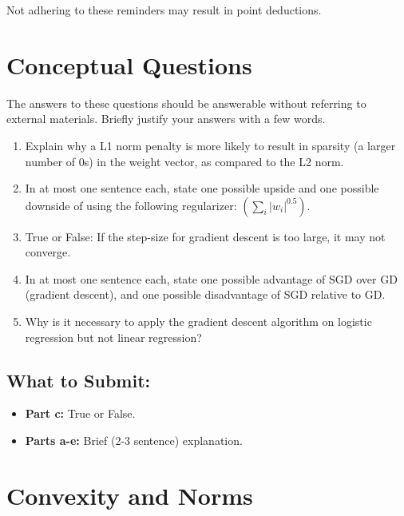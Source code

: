 \documentclass{article}
\begin{document}
Not adhering to these reminders may result in point deductions. \\

\clearpage{}

\section*{Conceptual Questions}

\begin{aprob}
    The answers to these questions should be answerable without referring to external materials.
    Briefly justify your answers with a few words.
    \begin{enumerate}
      \item {} Explain why a L1 norm penalty is more likely to result in sparsity (a larger number of 0s) in the weight vector, as compared to the L2 norm.
      \item {} In at most one sentence each, state one possible upside and one possible downside of using the following regularizer: $\left(\sum_{i}\left|w_{i}\right|^{0.5}\right)$.
      \item {} True or False: If the step-size for gradient descent is too large, it may not converge.
      \item {} In at most one sentence each, state one possible advantage of SGD over GD (gradient descent), and one possible disadvantage of SGD relative to GD.
      \item {} Why is it necessary to apply the gradient descent algorithm on logistic regression but not linear regression?
    \end{enumerate}
    
    \subsection*{What to Submit:}
    \begin{itemize}
        \item \textbf{Part c:} True or False. 
        \item \textbf{Parts a-e:} Brief (2-3 sentence) explanation.
    \end{itemize}
\end{aprob}

\newpage

\section*{Convexity and Norms}
\end{document}
